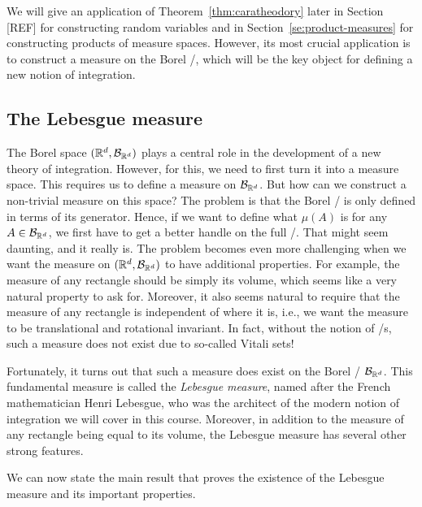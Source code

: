 We will give an application of Theorem~\ref{thm:caratheodory} later in Section [REF] for constructing random variables and in Section~\ref{se:product-measures} for constructing products of measure spaces. However, its most crucial application is to construct a measure on the Borel \sigalg/, which will be the key object for defining a new notion of integration.

\subsection{The Lebesgue measure}

The Borel space $(\mathbb R^d, \mathcal B_{\mathbb R^d})$ plays a central role in the development of a new theory of integration. However, for this, we need to first turn it into a measure space. This requires us to define a measure on $\mathcal B_{\mathbb R^d}$. But how can we construct a non-trivial measure on this space? The problem is that the Borel \sigalg/ is only defined in terms of its generator. Hence, if we want to define what $\mu(A)$ is for any $A \in \mathcal B_{\mathbb R^d}$, we first have to get a better handle on the full \sigalg/. That might seem daunting, and it really is. The problem becomes even more challenging when we want the measure on $(\mathbb R^d, \mathcal B_{\mathbb R^d})$ to have additional properties. For example, the measure of any rectangle should be simply its volume, which seems like a very natural property to ask for. Moreover, it also seems natural to require that the measure of any rectangle is independent of where it is, i.e., we want the measure to be translational and rotational invariant. In fact, without the notion of \sigalg/s, such a measure does not exist due to so-called Vitali sets!  

Fortunately, it turns out that such a measure does exist on the Borel \sigalg/ $\mathcal B_{\mathbb R^d}$. This fundamental measure is called the \emph{Lebesgue measure}, named after the French mathematician Henri Lebesgue, who was the architect of the modern notion of integration we will cover in this course. Moreover, in addition to the measure of any rectangle being equal to its volume, the Lebesgue measure has several other strong features. 


We can now state the main result that proves the existence of the Lebesgue measure and its important properties. 

